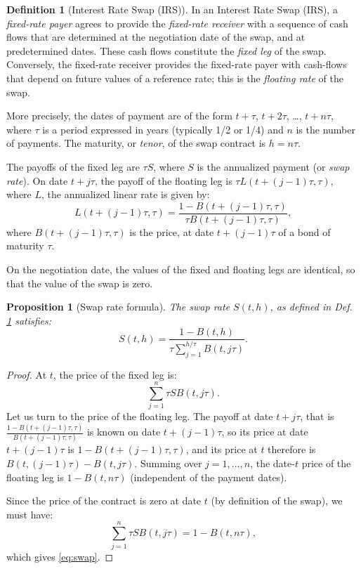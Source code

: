 \documentclass[
  12pt,
]{book}
\newtheorem{proposition}{Proposition}[chapter]
\theoremstyle{definition}
\newtheorem{definition}{Definition}[chapter]
\theoremstyle{definition}
\theoremstyle{definition}
\theoremstyle{definition}
\theoremstyle{remark}
\begin{document}
\begin{definition}[Interest Rate Swap (IRS)]
\protect\hypertarget{def:swap}{}\label{def:swap}In an Interest Rate Swap (IRS), a \emph{fixed-rate payer} agrees to provide the \emph{fixed-rate receiver} with a sequence of cash flows that are determined at the negotiation date of the swap, and at predetermined dates. These cash flows constitute the \emph{fixed leg} of the swap. Conversely, the fixed-rate receiver provides the fixed-rate payer with cash-flows that depend on future values of a reference rate; this is the \emph{floating rate} of the swap.

More precisely, the dates of payment are of the form \(t+ \tau\), \(t + 2\tau\), \dots, \(t + n\tau\), where \(\tau\) is a period expressed in years (typically 1/2 or 1/4) and \(n\) is the number of payments. The maturity, or \emph{tenor}, of the swap contract is \(h = n \tau\).

The payoffs of the fixed leg are \(\tau S\), where \(S\) is the annualized payment (or \emph{swap rate}). On date \(t+j\tau\), the payoff of the floating leg is \(\tau L(t+(j-1)\tau,\tau)\), where \(L\), the annualized linear rate is given by:
\[
L(t+(j-1)\tau,\tau) = \frac{1 - B(t+(j-1)\tau,\tau)}{\tau B(t+(j-1)\tau,\tau)},
\]
where \(B(t+(j-1)\tau,\tau)\) is the price, at date \(t+(j-1)\tau\) of a bond of maturity \(\tau\).

On the negotiation date, the values of the fixed and floating legs are identical, so that the value of the swap is zero.
\end{definition}

\begin{proposition}[Swap rate formula]
\protect\hypertarget{prp:swap}{}\label{prp:swap}The swap rate \(S(t,h)\), as defined in Def. \ref{def:swap} satisfies:
\begin{equation}
\boxed{S(t,h) = \frac{1 - B(t,h)}{\tau \sum_{j=1}^{h/\tau}  B(t,j\tau)}.}\label{eq:swap}
\end{equation}
\end{proposition}

\begin{proof}
At \(t\), the price of the fixed leg is:
\[
\sum_{j=1}^n \tau S B(t,j\tau).
\]
Let us turn to the price of the floating leg. The payoff at date \(t+j\tau\), that is \(\frac{1 - B(t+(j-1)\tau,\tau)}{B(t+(j-1)\tau,\tau)}\) is known on date \(t+(j-1)\tau\), so its price at date \(t+(j-1)\tau\) is \(1 - B(t+(j-1)\tau,\tau)\), and its price at \(t\) therefore is \(B(t,(j-1)\tau) - B(t,j\tau)\). Summing over \(j=1,\dots,n\), the date-\(t\) price of the floating leg is \(1 - B(t,n\tau)\) (independent of the payment dates).

Since the price of the contract is zero at date \(t\) (by definition of the swap), we must have:
\[
\sum_{j=1}^n \tau S B(t,j\tau) = 1 - B(t,n\tau),
\]
which gives \eqref{eq:swap}.
\end{proof}
\end{document}
